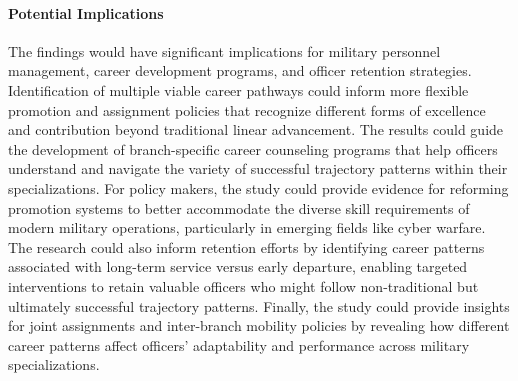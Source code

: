 \documentclass[./main.tex]{subfiles}
\begin{document}
\paragraph{Potential Implications}\label{potential-implications}

The findings would have significant implications for military personnel
management, career development programs, and officer retention
strategies. Identification of multiple viable career pathways could
inform more flexible promotion and assignment policies that recognize
different forms of excellence and contribution beyond traditional linear
advancement. The results could guide the development of branch-specific
career counseling programs that help officers understand and navigate
the variety of successful trajectory patterns within their
specializations. For policy makers, the study could provide evidence for
reforming promotion systems to better accommodate the diverse skill
requirements of modern military operations, particularly in emerging
fields like cyber warfare. The research could also inform retention
efforts by identifying career patterns associated with long-term service
versus early departure, enabling targeted interventions to retain
valuable officers who might follow non-traditional but ultimately
successful trajectory patterns. Finally, the study could provide
insights for joint assignments and inter-branch mobility policies by
revealing how different career patterns affect officers' adaptability
and performance across military specializations.
\end{document}
